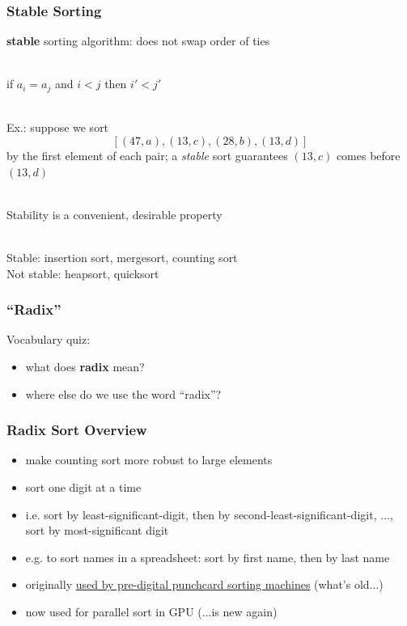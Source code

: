 \documentclass[10pt,aspectratio=169]{beamer}
\newcommand{\stanza}{ \\~\ }
\begin{document}
\begin{frame} \frametitle{Stable Sorting}
\textbf{stable} sorting algorithm: does not swap order of ties \stanza

if $a_i=a_j$ and $i<j$ then $i' < j'$ \stanza

Ex.: suppose we sort
\[ [(47, a), (13, c), (28, b), (13, d)] \]
by the first element of each pair; a \emph{stable} sort guarantees $(13, c)$
comes before $(13, d)$ \stanza

Stability is a convenient, desirable property \stanza

Stable: insertion sort, mergesort, counting sort \\
Not stable: heapsort, quicksort
\end{frame}

\begin{frame} \frametitle{``Radix''}
Vocabulary quiz:
\begin{itemize}
  \item what does \textbf{radix} mean?
  \item where else do we use the word ``radix''?
\end{itemize}
\end{frame}

\begin{frame} \frametitle{Radix Sort Overview}
\begin{itemize}
  \item make counting sort more robust to large elements
  \item sort one digit at a time
  \item i.e. sort by least-significant-digit, then by second-least-significant-digit, $\ldots$,
    sort by most-significant digit
  \item e.g. to sort names in a spreadsheet: sort by first name, then by last name
  \item originally
  \href{https://en.wikipedia.org/wiki/Radix_sort\#/media/File:SEACComputer_038.jpg}{used by pre-digital punchcard sorting machines}
    (what's old...)
  \item now used for parallel sort in GPU (...is new again)
\end{itemize}
\end{frame}
\end{document}
